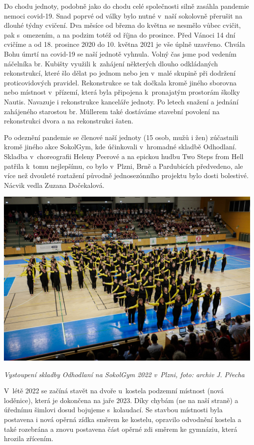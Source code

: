 \documentclass[a5paper, 11pt, twoside]{article}
\begin{document}
Do chodu jednoty, podobně jako do chodu celé společnosti silně zasáhla
pandemie nemoci covid-19. Snad poprvé od války bylo nutné v~naší
sokolovně přerušit na dlouhé týdny cvičení. Dva měsíce od března do
května se nesmělo vůbec cvičit, pak s~omezením, a na podzim totéž od
října do prosince. Před Vánoci 14 dní cvičíme a od 18. prosince 2020 do
10. května 2021 je vše úplně uzavřeno. Chvála Bohu úmrtí na covid-19 se
naší jednotě vyhnula. Volný čas jsme pod vedením náčelníka br. Kubišty
využili k~zahájení některých dlouho odkládaných rekonstrukcí, které šlo
dělat po jednom nebo jen v~malé skupině při dodržení proticovidových
pravidel. Rekonstrukce se tak dočkala kromě jiného sborovna nebo
místnost v~přízemí, která byla připojena k~pronajatým prostorám školky
Nautis. Navazuje i rekonstrukce kanceláře jednoty. Po letech snažení a
jednání zahájeného starostou br. Müllerem také dostáváme stavební
povolení na rekonstrukci dvora a na rekonstrukci šaten.

Po odeznění pandemie se členové naší jednoty (15 osob, mužů i žen)
zúčastnili kromě jiného akce SokolGym, kde účinkovali v~hromadné skladbě
Odhodlaní. Skladba v~choreografii Heleny Peerové a na epickou hudbu Two
Steps from Hell patřila k~tomu nejlepšímu, co bylo v~Plzni, Brně a
Pardubicích předvedeno, ale více než dvouleté roztažení původně
jednosezónního projektu bylo dosti bolestivé. Nácvik vedla Zuzana
Dočekalová.

 \includegraphics[width=\textwidth]{img/66_odhodlani.jpg}

\textit{Vystoupení skladby Odhodlaní na SokolGym 2022 v~Plzni, foto:
archiv J. Přecha}

V~létě 2022 se začíná stavět na dvoře u~kostela podzemní místnost (nová
loděnice), která je dokončena na jaře 2023. Díky chybám (ne na naší
straně) a úřednímu šimlovi dosud bojujeme s~kolaudací. Se stavbou
místnosti byla postavena i nová opěrná zídka směrem ke kostelu, opravilo
odvodnění kostela a také rozebrána a znovu postavena část opěrné zdi
směrem ke gymnáziu, která hrozila zřícením.
\end{document}
